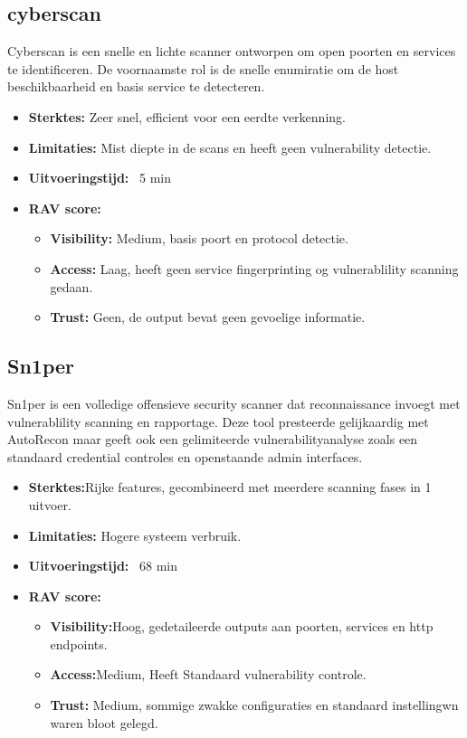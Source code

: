 \subsection{cyberscan}

Cyberscan is een snelle en lichte scanner ontworpen om open poorten en services te identificeren. 
De voornaamste rol is de snelle enumiratie om de host beschikbaarheid en basis service te detecteren.

\begin{itemize}
  \item \textbf{Sterktes:} Zeer snel, efficient voor een eerdte verkenning.
  \item \textbf{Limitaties:} Mist diepte in de scans en heeft geen vulnerability detectie.
  \item \textbf{Uitvoeringstijd:} ~5 min
  \item \textbf{RAV score:}
    \small{
    \begin{itemize}
      \item \textbf{Visibility:} Medium, basis poort en protocol detectie.
      \item \textbf{Access:} Laag, heeft geen service fingerprinting og vulnerablility scanning gedaan.
      \item \textbf{Trust:} Geen, de output bevat geen gevoelige informatie. 
    \end{itemize}
    }
\end{itemize}

\subsection{Sn1per}
Sn1per is een volledige offensieve security scanner dat reconnaissance invoegt met vulnerablility scanning en rapportage. 
Deze tool presteerde gelijkaardig met AutoRecon maar geeft ook een gelimiteerde vulnerabilityanalyse zoals een standaard credential controles en openstaande admin interfaces.

\begin{itemize}
  \item \textbf{Sterktes:}Rijke features, gecombineerd met meerdere scanning fases in 1 uitvoer.
  \item \textbf{Limitaties:} Hogere systeem verbruik.
  \item \textbf{Uitvoeringstijd:} ~68 min
  \item \textbf{RAV score:}
    \small{
    \begin{itemize}
      \item \textbf{Visibility:}Hoog, gedetaileerde outputs aan poorten, services en http endpoints.
      \item \textbf{Access:}Medium, Heeft Standaard vulnerability controle.
      \item \textbf{Trust:} Medium, sommige zwakke configuraties en standaard instellingwn waren bloot gelegd.
    \end{itemize}
    }
\end{itemize}


